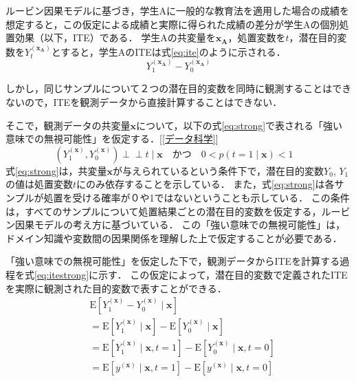 \documentclass[dvipdfmx]{jreport}
\begin{document}
ルービン因果モデルに基づき，学生Aに一般的な教育法を適用した場合の成績を想定すると，この仮定による成績と実際に得られた成績の差分が学生Aの個別処置効果（以下，ITE）である．
学生Aの共変量を$\boldsymbol{x_A}$，処置変数を$t$，潜在目的変数を$Y_t^{(\boldsymbol{x_A})}$とすると，学生AのITEは式\eqref{eq:ite}のように示される．
\begin{equation}
    Y_1^{(\boldsymbol{x_A})} - Y_0^{(\boldsymbol{x_A})} \label{eq:ite}
\end{equation}

しかし，同じサンプルについて２つの潜在目的変数を同時に観測することはできないので，ITEを観測データから直接計算することはできない．

そこで，観測データの共変量$\boldsymbol{x}$について，以下の式\eqref{eq:strong}で表される「強い意味での無視可能性」を仮定する．[\ref{データ科学}]
\begin{equation}
    (Y_1^{(\boldsymbol{x})}, Y_0^{(\boldsymbol{x})}) \perp\!\!\!\perp t \mid \boldsymbol{x} \quad \label{eq:strong}
    \text{かつ} \quad 0 < p(t = 1 \mid \boldsymbol{x}) < 1 \quad
\end{equation}
式\eqref{eq:strong}は，共変量$\boldsymbol{x}$が与えられているという条件下で，潜在目的変数$Y_0$, $Y_1$の値は処置変数$t$にのみ依存することを示している．
また，式\eqref{eq:strong}は各サンプルが処置を受ける確率が０や1ではないということも示している．
この条件は，すべてのサンプルについて処置結果ごとの潜在目的変数を仮定する，ルービン因果モデルの考え方に基づいている．
この「強い意味での無視可能性」は，ドメイン知識や変数間の因果関係を理解した上で仮定することが必要である．

「強い意味での無視可能性」を仮定した下で，観測データからITEを計算する過程を式\eqref{eq:itestrong}に示す．
この仮定によって，潜在目的変数で定義されたITEを実際に観測された目的変数で表すことができる．
\begin{equation}
    \begin{aligned}
    &\mathrm{E}[Y_1^{(\boldsymbol{x})} - Y_0^{(\boldsymbol{x})} \mid \boldsymbol{x}] \\
    &= \mathrm{E}[Y_1^{(\boldsymbol{x})} \mid \boldsymbol{x}] - \mathrm{E}[Y_0^{(\boldsymbol{x})} \mid \boldsymbol{x}] \\
    &= \mathrm{E}[Y_1^{(\boldsymbol{x})} \mid \boldsymbol{x}, t = 1] - \mathrm{E}[Y_0^{(\boldsymbol{x})} \mid \boldsymbol{x}, t = 0] \\
    &= \mathrm{E}[y^{(\boldsymbol{x})} \mid \boldsymbol{x}, t = 1] - \mathrm{E}[y^{(\boldsymbol{x})} \mid \boldsymbol{x}, t = 0] \label{eq:itestrong}
    \end{aligned}
\end{equation}
\end{document}
